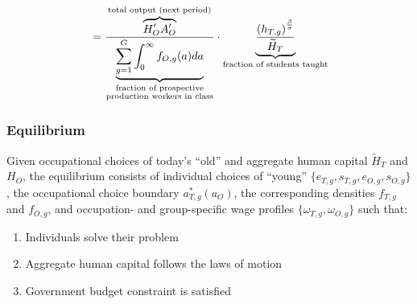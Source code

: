 \documentclass[11pt]{beamer}
\begin{document}
\begin{frame}
\begin{itemize}
\begin{align*}
					& =\frac{\overbrace{{H}'_O {A}'_O}^{\textrm{total output (next period)}}}{\underbrace{\sum_{g=1}^G \int_0^\infty f_{O,g}(a) da}_{\begin{subarray}{c}\textrm{fraction of prospective} \\ 
								\textrm{production workers in class}\end{subarray}}} \cdot \underbrace{\frac{\left( h_{T,g} \right)^{\frac{\beta}{\sigma}}}{{\widetilde{H}_T}}}_{\textrm{fraction of students taught}}\\ 
				\end{align*}
			\end{itemize}
			
		\end{frame}
		
		\begin{frame}
			\frametitle{Equilibrium}
			\label{eqm}
			\footnotesize
			Given occupational choices of today's ``old'' and aggregate human capital $\widetilde{H}_{T}$ and ${H}_{O}$, the equilibrium consists of individual choices of ``young'' $\{e_{T,g}, s_{T,g}, e_{O,g}, s_{O,g}\}$, the occupational choice boundary $a^*_{T,g}(a_O)$, the corresponding densities $f_{T,g}$ and $f_{O,g}$, and occupation- and group-specific wage profiles $\{\omega_{T,g}, \omega_{O,g}\}$ such that:
			\begin{enumerate}
				\item Individuals solve their problem \hyperlink{time_inv}{} \hyperlink{good_inv}{}
				\item Aggregate human capital follows the laws of motion \hyperlink{laws}{}
				\item Government budget constraint is satisfied
			\end{enumerate}
			\hyperlink{wage}{} \hyperlink{param}{}
		\end{frame}
		
		
\end{document}
